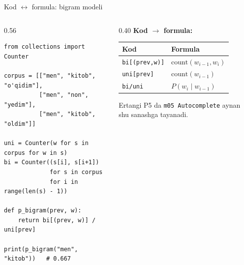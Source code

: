 \documentclass[aspectratio=169,11pt]{beamer}
\begin{document}
\begin{frame}[fragile]{Kod $\leftrightarrow$ formula: bigram modeli}
  \begin{columns}[T]
    \begin{column}{0.56\textwidth}
\begin{lstlisting}
from collections import Counter

corpus = [["men", "kitob", "o'qidim"],
          ["men", "non", "yedim"],
          ["men", "kitob", "oldim"]]

uni = Counter(w for s in corpus for w in s)
bi = Counter((s[i], s[i+1])
             for s in corpus
             for i in range(len(s) - 1))

def p_bigram(prev, w):
    return bi[(prev, w)] / uni[prev]

print(p_bigram("men", "kitob"))   # 0.667
\end{lstlisting}
    \end{column}
    \begin{column}{0.40\textwidth}
      \textbf{Kod $\to$ formula:}\\[3pt]
      \footnotesize
      \begin{tabular}{p{2.0cm}p{2.0cm}}
        \toprule
        Kod & Formula \\
        \midrule
        \texttt{bi[(prev,w)]} & $\text{count}(w_{i-1},w_i)$ \\
        \texttt{uni[prev]} & $\text{count}(w_{i-1})$ \\
        \texttt{bi/uni} & $P(w_i{\mid}w_{i-1})$ \\
        \bottomrule
      \end{tabular}
      \vspace{4pt}
      \begin{tcolorbox}[okbox,top=2pt,bottom=2pt]
        \footnotesize
        Ertangi P5 da \texttt{m05 Autocomplete} aynan shu sanashga tayanadi.
      \end{tcolorbox}
    \end{column}
  \end{columns}
\end{frame}
\end{document}
